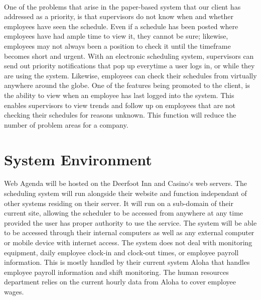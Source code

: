 \documentclass[letterpaper,12pt]{report}
\begin{document}
\paragraph{}\hspace{0.6cm}One of the problems that arise in the paper-based system that our client has addressed as a priority, is that supervisors do not know when and whether employees have seen the schedule. Even if a schedule has been posted where employees have had ample time to view it, they cannot be sure; likewise, employees may not always been a position to check it until the timeframe becomes short and urgent. With an electronic scheduling system, supervisors can send out priority notifications that pop up everytime a user logs in, or while they are using the system. Likewise, employees can check their schedules from virtually anywhere around the globe. One of the features being promoted to the client, is the ability to view when an employee has last logged into the system. This enables supervisors to view trends and follow up on employees that are not checking their schedules for reasons unknown. This function will reduce the number of problem areas for a company.

\section{System Environment}
\hspace{1cm}Web Agenda will be hosted on the Deerfoot Inn and Casino`s web servers. The scheduling system will run alongside their website and function independant of other systems residing on their server. It will run on a sub-domain of their current site, allowing the scheduler to be accessed from anywhere at any time provided the user has proper authority to use the service. The system will be able to be accessed through their internal computers as well as any external computer or mobile device with internet access. The system does not deal with monitoring  equipment, daily employee clock-in and clock-out times, or employee payroll information. This is mostly handled by their current system Aloha that handles employee payroll information and shift monitoring. The human resources department relies on the current hourly data from Aloha to cover employee wages.
\end{document}
